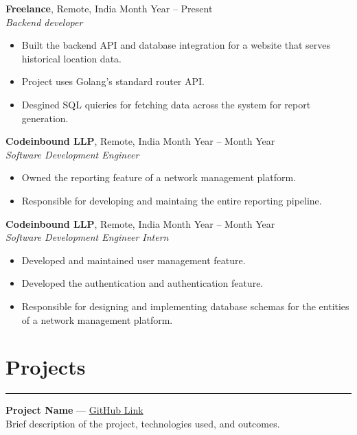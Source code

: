 \documentclass[11pt]{article}
\begin{document}
\textbf{Freelance}, Remote, India \hfill Month Year -- Present \\
\textit{Backend developer} \\
\vspace{-1.5\baselineskip}
\begin{itemize}[label=--]
	\item Built the backend API and database integration for a website that
	    serves historical location data.
	\item Project uses Golang's standard router API.
	\item Desgined SQL quieries for fetching data across the system for
		report generation.
\end{itemize}

\textbf{Codeinbound LLP}, Remote, India \hfill Month Year -- Month Year \\
\textit{Software Development Engineer} \\
\vspace{-1.5\baselineskip}
\begin{itemize}[label=--]
	\item Owned the reporting feature of a network management platform.
	\item Responsible for developing and maintaing the entire reporting pipeline.
\end{itemize}

\textbf{Codeinbound LLP}, Remote, India \hfill Month Year -- Month Year \\
\textit{Software Development Engineer Intern} \\
\vspace{-1.5\baselineskip}
\begin{itemize}[label=--]
	\item Developed and maintained user management feature.
	\item Developed the authentication and authentication feature.
	\item Responsible for designing and implementing database schemas for 
		the entities of a network management platform.
\end{itemize}

\vspace{-0.5\baselineskip}
\section*{Projects}
\hrule
\textbf{Project Name} — \href{https://github.com/projectlink}{GitHub Link} \\
Brief description of the project, technologies used, and outcomes.
\end{document}
